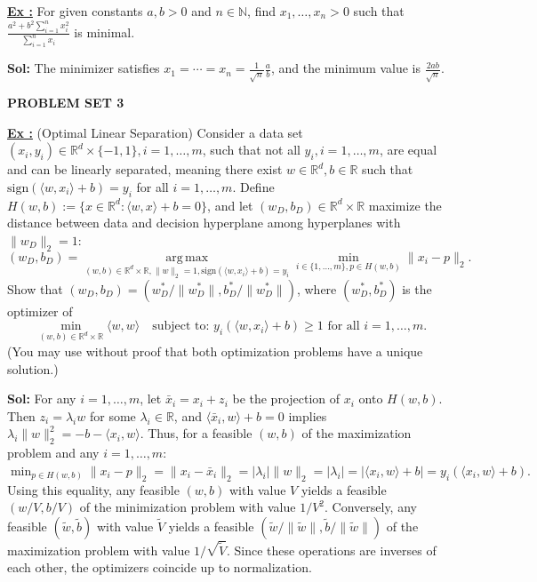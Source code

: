 \documentclass[a4paper,10pt]{article}
\newcommand{\subtitle}[1]{\vspace{0.25cm}\begin{normalsize}\textbf{\textcolor{gray!150}{\uppercase{#1}}}\end{normalsize}}
\newcounter{exerciseCounter}
\newcommand{\exercise}[1]{%
    \vspace{1mm}
    \stepcounter{exerciseCounter}%
    \color{exerciseBlack}
    \textbf{\underline{Ex \theexerciseCounter:}} #1
}
\newcommand{\solution}[1]{%
    {\color{solutionGray} \textbf{Sol: } #1} %
}
\begin{document}
\begin{scriptsize}
\exercise{For given constants $a, b > 0$ and $n \in \mathbb{N}$, find $x_1, \ldots, x_n > 0$ such that $\frac{a^2 + b^2 \sum_{i=1}^n x_i^2}{\sum_{i=1}^n x_i}$ is minimal.}
\solution{The minimizer satisfies $x_1 = \cdots = x_n = \frac{1}{\sqrt{n}} \frac{a}{b}$, and the minimum value is $\frac{2ab}{\sqrt{n}}$.}

\subtitle{Problem Set 3}

\exercise{(Optimal Linear Separation) Consider a data set \((x_i, y_i) \in \mathbb{R}^d \times \{-1, 1\}, i = 1, \ldots, m\), such that not all \(y_i, i = 1, \ldots, m\), are equal and can be linearly separated, meaning there exist \(w \in \mathbb{R}^d, b \in \mathbb{R}\) such that \(\text{sign}(\langle w, x_i \rangle + b) = y_i\) for all \(i = 1, \ldots, m\). Define \(H(w, b) := \{x \in \mathbb{R}^d : \langle w, x \rangle + b = 0\}\), and let \((w_D, b_D) \in \mathbb{R}^d \times \mathbb{R}\) maximize the distance between data and decision hyperplane among hyperplanes with \(\|w_D\|_2 = 1\): \[
(w_D, b_D) = \operatorname*{arg\,max}_{(w,b) \in \mathbb{R}^d \times \mathbb{R}, \|w\|_2=1, \text{sign}(\langle w,x_i \rangle+b)=y_i} \min_{i \in \{1, \ldots, m\}, p \in H(w,b)} \|x_i - p\|_2. \]
Show that \((w_D, b_D) = (w^*_D/\|w^*_D\|, b^*_D/\|w^*_D\|)\), where \((w^*_D, b^*_D)\) is the optimizer of
\[
\min_{(w,b) \in \mathbb{R}^d \times \mathbb{R}} \langle w, w \rangle \quad \text{subject to: } y_i(\langle w, x_i \rangle + b) \geq 1 \text{ for all } i = 1, \ldots, m.
\]
(You may use without proof that both optimization problems have a unique solution.)}
\solution{For any \(i = 1, \ldots, m\), let \(\bar{x}_i = x_i + z_i\) be the projection of \(x_i\) onto \(H(w, b)\). Then \(z_i = \lambda_i w\) for some \(\lambda_i \in \mathbb{R}\), and \(\langle \bar{x}_i, w \rangle + b = 0\) implies \(\lambda_i \|w\|^2_2 = -b - \langle x_i, w \rangle\). Thus, for a feasible \((w, b)\) of the maximization problem and any \(i = 1, \ldots, m\):
$
\min_{p \in H(w,b)} \|x_i - p\|_2 = \|x_i - \bar{x}_i\|_2 = |\lambda_i| \|w\|_2 = |\lambda_i| = |\langle x_i, w \rangle + b| = y_i(\langle x_i, w \rangle + b).
$
Using this equality, any feasible \((w, b)\) with value \(V\) yields a feasible \((w/V, b/V)\) of the minimization problem with value \(1/V^2\). Conversely, any feasible \((\tilde{w}, \tilde{b})\) with value \(\tilde{V}\) yields a feasible \((\tilde{w}/\|\tilde{w}\|, \tilde{b}/\|\tilde{w}\|)\) of the maximization problem with value \(1/\sqrt{\tilde{V}}\). Since these operations are inverses of each other, the optimizers coincide up to normalization.}


\end{scriptsize}
\end{document}
